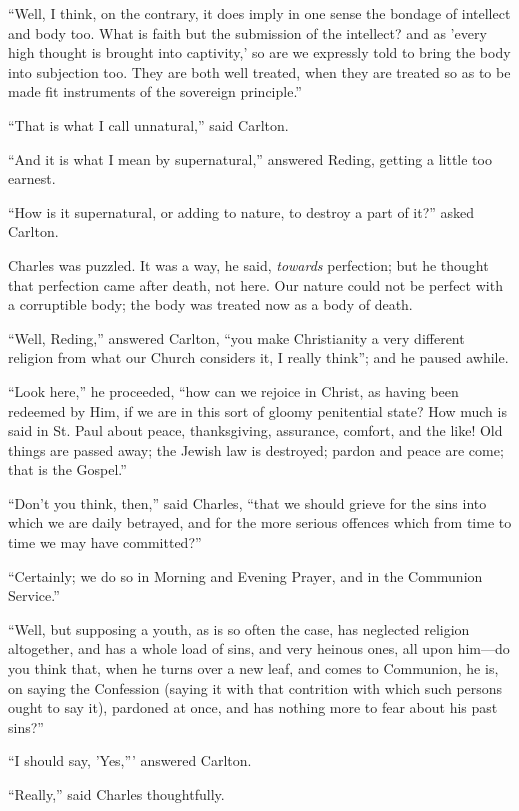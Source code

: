 ``Well, I think, on the contrary, it does imply in one sense
the bondage of intellect and body too. What is faith but the
submission of the intellect? and as 'every high thought is brought
into captivity,' so are we expressly told to bring the body into
subjection too. They are both well treated, when they are treated so
as to be made fit instruments of the sovereign principle.''

``That is what I call unnatural,'' said Carlton.

``And it is what I mean by supernatural,'' answered Reding,
getting a little too earnest.

``How is it supernatural, or adding to nature, to destroy a
part of it?'' asked Carlton.

Charles was puzzled. It was a way, he said, \emph{towards}
perfection; but he thought that perfection came after death, not here.
Our nature could not be perfect with a corruptible body; the body was
treated now as a body of death.

``Well, Reding,'' answered Carlton, ``you make
Christianity a very different religion from what our Church considers
it, I really think''; and he paused awhile.

``Look here,'' he proceeded, ``how can we rejoice in
Christ, as having been redeemed by Him, if we are in this sort
of gloomy penitential state? How much is said in St. Paul about peace,
thanksgiving, assurance, comfort, and the like! Old things are passed
away; the Jewish law is destroyed; pardon and peace are come; that is
the Gospel.''

``Don't you think, then,'' said Charles, ``that we
should grieve for the sins into which we are daily betrayed, and for
the more serious offences which from time to time we may have
committed?''

``Certainly; we do so in Morning and Evening Prayer, and in the
Communion Service.''

``Well, but supposing a youth, as is so often the case, has
neglected religion altogether, and has a whole load of sins, and very
heinous ones, all upon him—do you think that, when he turns over a
new leaf, and comes to Communion, he is, on saying the Confession
(saying it with that contrition with which such persons ought to say
it), pardoned at once, and has nothing more to fear about his past
sins?''

``I should say, 'Yes,''' answered Carlton.

``Really,'' said Charles thoughtfully.

